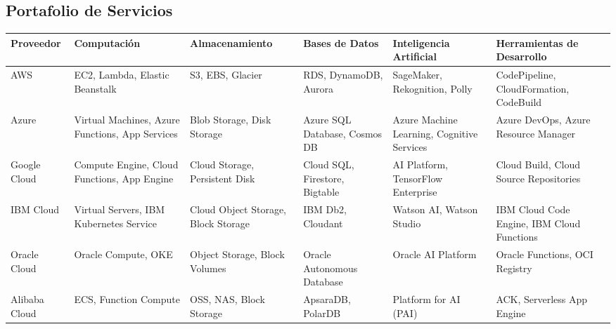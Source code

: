 {        \begin{landscape}
            \subsection{Portafolio de Servicios}
                \begin{longtable}{|p{2cm}|p{2.75cm}|p{2.75cm}|p{2.75cm}|p{3.0cm}|p{2.75cm}|}
                    \hline
                    \textbf{Proveedor} & \textbf{Computación} & \textbf{Almacenamiento} & \textbf{Bases de Datos} & \textbf{Inteligencia Artificial} & \textbf{Herramientas de Desarrollo} \\
                    \hline
                    AWS & EC2, Lambda, Elastic Beanstalk & S3, EBS, Glacier & RDS, DynamoDB, Aurora & SageMaker, Rekognition, Polly & CodePipeline, CloudFormation, CodeBuild \\
                    \hline
                    Azure & Virtual Machines, Azure Functions, App Services & Blob Storage, Disk Storage & Azure SQL Database, Cosmos DB & Azure Machine Learning, Cognitive Services & Azure DevOps, Azure Resource Manager \\
                    \hline
                    Google Cloud & Compute Engine, Cloud Functions, App Engine & Cloud Storage, Persistent Disk & Cloud SQL, Firestore, Bigtable & AI Platform, TensorFlow Enterprise & Cloud Build, Cloud Source Repositories \\
                    \hline
                    IBM Cloud & Virtual Servers, IBM Kubernetes Service & Cloud Object Storage, Block Storage & IBM Db2, Cloudant & Watson AI, Watson Studio & IBM Cloud Code Engine, IBM Cloud Functions \\
                    \hline
                    Oracle Cloud & Oracle Compute, OKE & Object Storage, Block Volumes & Oracle Autonomous Database & Oracle AI Platform & Oracle Functions, OCI Registry \\
                    \hline
                    Alibaba Cloud & ECS, Function Compute & OSS, NAS, Block Storage & ApsaraDB, PolarDB & Platform for AI (PAI) & ACK, Serverless App Engine \\
                    \hline
                \end{longtable}
        \end{landscape}

}
